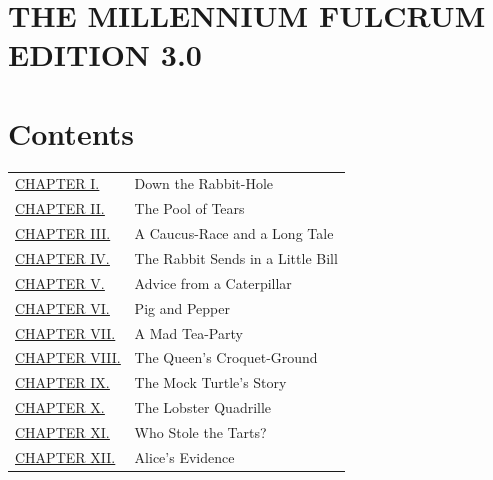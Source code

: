 \documentclass[11pt,openany,oneside]{book}
\begin{document}
\chapter*{THE MILLENNIUM FULCRUM EDITION 3.0}
\par\medskip{\centering\rule{0.3\linewidth}{0.4pt}\par}\medskip
\hypertarget{d2.fp1867}{}


\clearpage{}
{}
\chapter*{Contents}
\vspace{\baselineskip}
\vspace{\baselineskip}
\begin{longtable}{@{}p{97.9pt}p{220.2pt}@{}}
\toprule
\leavevmode\hypertarget{d3.fp2022}{}\hyperlink{d4.fp4363}{\uline{CHAPTER I.}} & Down the Rabbit-Hole \\
\hyperlink{d5.fp18410}{\uline{CHAPTER II.}} & The Pool of Tears \\
\hyperlink{d6.fp31850}{\uline{CHAPTER III.}} & A Caucus-Race and a Long Tale \\
\hyperlink{d7.fp46523}{\uline{CHAPTER IV.}} & The Rabbit Sends in a Little Bill \\
\hyperlink{d8.fp63138}{\uline{CHAPTER V.}} & Advice from a Caterpillar \\
\hyperlink{d9.fp81080}{\uline{CHAPTER VI.}} & Pig and Pepper \\
\hyperlink{d10.fp100315}{\uline{CHAPTER VII.}} & A Mad Tea-Party \\
\hyperlink{d11.fp119481}{\uline{CHAPTER VIII.}} & The Queen’s Croquet-Ground \\
\hyperlink{d12.fp137255}{\uline{CHAPTER IX.}} & The Mock Turtle’s Story \\
\hyperlink{d13.fp155277}{\uline{CHAPTER X.}} & The Lobster Quadrille \\
\hyperlink{d14.fp173712}{\uline{CHAPTER XI.}} & Who Stole the Tarts? \\
\hyperlink{d15.fp188591}{\uline{CHAPTER XII.}} & Alice’s Evidence \\
\bottomrule
\end{longtable}

\end{document}
